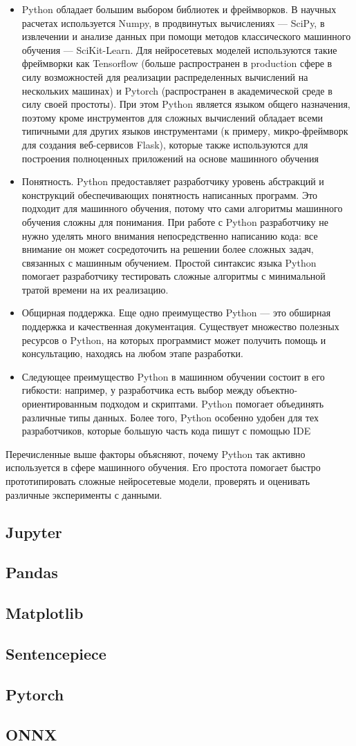 \begin{itemize}
	\item Python обладает большим выбором библиотек и фреймворков.  В научных расчетах используется Numpy, в продвинутых вычислениях — SciPy, в извлечении и анализе данных при помощи методов классического машинного обучения — SciKit-Learn. Для нейросетевых моделей используются такие фреймворки как Tensorflow (больше распространен в production сфере в силу возможностей для реализации распределенных вычислений на нескольких машинах) и Pytorch (распространен в академической среде в силу своей простоты). При этом Python является языком общего назначения, поэтому кроме инструментов для сложных вычислений обладает всеми типичными для других языков инструментами (к примеру, микро-фреймворк для создания веб-сервисов Flask), которые также используются для построения полноценных приложений на основе машинного обучения
	\item Понятность. Python предоставляет разработчику уровень абстракций и конструкций обеспечивающих понятность написанных программ. Это подходит для машинного обучения, потому что сами алгоритмы машинного обучения сложны для понимания. При работе с Python разработчику не нужно уделять много внимания непосредственно написанию кода: все внимание он может сосредоточить на решении более сложных задач, связанных с машинным обучением. Простой синтаксис языка Python помогает разработчику тестировать сложные алгоритмы с минимальной тратой времени на их реализацию.
	\item Общирная поддержка. Еще одно преимущество Python — это обширная поддержка и качественная документация. Существует множество полезных ресурсов о Python, на которых программист может получить помощь и консультацию, находясь на любом этапе разработки.
	\item Следующее преимущество Python в машинном обучении состоит в его гибкости: например, у разработчика есть выбор между объектно-ориентированным подходом и скриптами. Python помогает объединять различные типы данных. Более того, Python особенно удобен для тех разработчиков, которые большую часть кода пишут с помощью IDE
\end{itemize}
Перечисленные выше факторы объясняют, почему Python так активно используется в сфере машинного обучения. Его простота помогает быстро прототипировать сложные нейросетевые модели, проверять и оценивать различные эксперименты с данными.

\subsection{Jupyter}
\subsection{Pandas}
\subsection{Matplotlib}
\subsection{Sentencepiece}
\subsection{Pytorch}
\subsection{ONNX}
